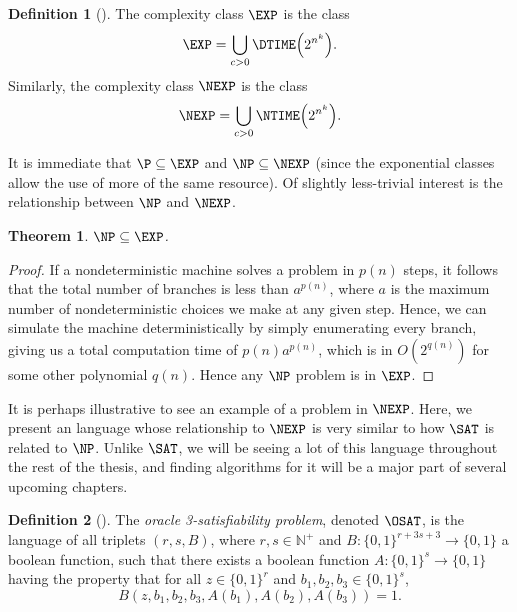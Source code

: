 \documentclass[english,12pt]{reedthesis}
\theoremstyle{plain}
\newtheorem{thm}{Theorem}[section]
\theoremstyle{definition}
\newtheorem{defn}[defn]{Definition}
\theoremstyle{remark}
\begin{document}
\begin{defn}[{\cite[.2]{AB09}}]%
  \label{def:exp-nexp}
  The complexity class $\EXP$ is the class
  \[
    \EXP = \bigcup_{c > 0}\DTIME\mleft(2^{n^{k}}\mright).
  \]
  Similarly, the complexity class $\NEXP$ is the class
  \[
    \NEXP = \bigcup_{c > 0}\NTIME\mleft(2^{n^{k}}\mright).
  \]
\end{defn}

It is immediate that $\P \subseteq \EXP$ and $\NP \subseteq \NEXP$ (since the exponential
classes allow the use of more of the same resource). Of slightly less-trivial
interest is the relationship between $\NP$ and $\NEXP$.

\begin{thm}\label{thm:np-exp}
  $\NP \subseteq \EXP$.
\end{thm}

\begin{proof}
  If a nondeterministic machine solves a problem in $p(n)$ steps, it follows
  that the total number of branches is less than $a^{p(n)}$, where $a$ is the
  maximum number of nondeterministic choices we make at any given step. Hence,
  we can simulate the machine deterministically by simply enumerating every
  branch, giving us a total computation time of $p(n)a^{p(n)}$, which is in
  $O(2^{q(n)})$ for some other polynomial $q(n)$. Hence any $\NP$ problem is in
  $\EXP$.
\end{proof}

It is perhaps illustrative to see an example of a problem in $\NEXP$. Here, we
present an language whose relationship to $\NEXP$ is very similar to how $\SAT$
is related to $\NP$. Unlike $\SAT$, we will be seeing a lot of this language
throughout the rest of the thesis, and finding algorithms for it will be a major
part of several upcoming chapters.

\begin{defn}[{\cite[Def.\ 14.1]{CFGS22}}]\label{def:oracle-3sat}
  The \emph{oracle 3-satisfiability problem}, denoted $\OSAT$, is the language
  of all triplets $(r, s, B)$, where $r, s \in \mathbb{N}^{+}$ and
  $B\colon \{0, 1\}^{r+3s+3} \rightarrow \{0, 1\}$ a boolean function, such that there
  exists a boolean function $A\colon \{0, 1\}^{s} \rightarrow \{0, 1\}$ having
  the property that for all $z \in \{0, 1\}^{r}$ and
  $b_{1}, b_{2}, b_{3} \in \{0, 1\}^{s}$,
  \begin{equation*}
    B(z, b_{1}, b_{2}, b_{3}, A(b_{1}), A(b_{2}), A(b_{3})) = 1.
  \end{equation*}
\end{defn}
\end{document}
